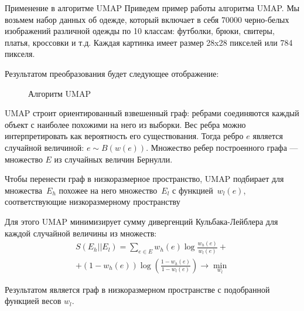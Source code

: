 \documentclass[final]{beamer}
\newlength{\onecolwid}
\begin{document}
\begin{frame}[t]
\begin{columns}[t]
\begin{column}{\onecolwid}
\begin{block}{Применение в алгоритме UMAP}
Приведем пример работы алгоритма UMAP. Мы возьмем набор данных об одежде, который включает в себя 70000 черно-белых изображений различной одежды по 10 классам: футболки, брюки, свитеры, платья, кроссовки и т.д. Каждая картинка имеет размер 28x28 пикселей или 784 пикселя.

Результатом преобразования будет следующее отображение:

\begin{figure}[!h]
	\noindent{}
	\caption{Алгоритм UMAP}
	\label{figCurves}
\end{figure} 

UMAP строит ориентированный взвешенный граф: ребрами соединяются каждый объект с наиболее похожими на него из выборки. Вес ребра можно интерпретировать как вероятность его существования. Тогда ребро $e$ является случайной величиной: $e \sim B(w(e))$. Множество ребер построенного графа --- множество $E$ из случайных величин Бернулли.

Чтобы перенести граф в низкоразмерное пространство, UMAP подбирает для множества~$E_h$ похожее на него множество~$E_l$ с функцией~$w_l(e)$, соответствующие низкоразмерному пространству

Для этого UMAP минимизирует сумму дивергенций Кульбака-Лейблера для каждой случайной величины из множеств:
\begin{multline*}
	S(E_h||E_l) = \sum_{e \in E} w_h(e) \log \frac{w_h(e)}{w_l(e)} + \\ + (1 - w_h(e)) \log \left(\frac{1 - w_h(e)}{1 - w_l(e)}\right) \rightarrow \min_{w_l}
\end{multline*}

Результатом является граф в низкоразмерном пространстве с подобранной функцией весов $w_l$.
\end{block}


\end{column}
\end{columns}
\end{frame}
\end{document}
